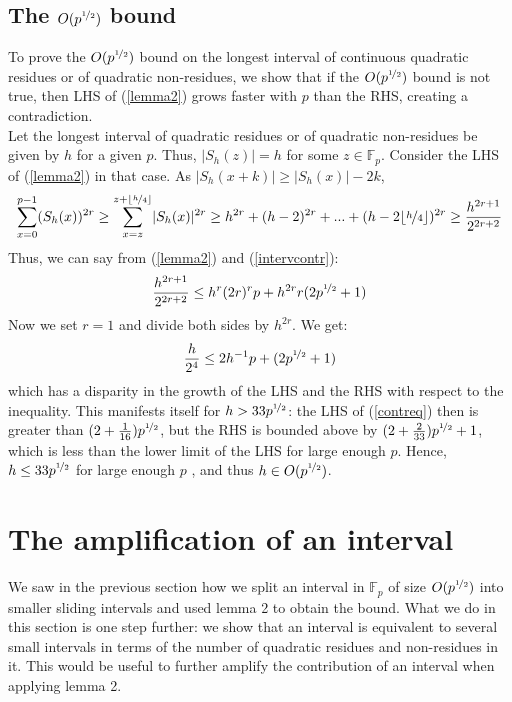 \documentclass{report}
\begin{document}
\subsection*{The $O(p^{\nicefrac{1}{2}})$ bound}
To prove the $O(p^{\nicefrac{1}{2}})$ bound on the longest interval of continuous quadratic residues or of quadratic non-residues, we show that if the $O(p^{\nicefrac{1}{2}})$ bound is not true, then LHS of (\ref{lemma2}) grows faster with $p$ than the RHS, creating a contradiction.\\
Let the longest interval of quadratic residues or of quadratic non-residues be given by $h$ for a given $p$. Thus, $\lvert S_h(z)\rvert=h$ for some $z\in \mathbb{F}_p$. Consider the LHS of (\ref{lemma2}) in that case. As $\lvert S_h(x+k)\rvert \geq \lvert S_h(x)\rvert-2k$,
\begin{equation} \label{intervcontr}
\sum\limits_{x=0}^{p-1}(S_h(x))^{2r}\geq\sum\limits_{x=z}^{z+\lfloor\nicefrac{h}{4}\rfloor}\lvert S_h(x)\rvert^{2r} \geq h^{2r}+(h-2)^{2r}+...+(h-2\lfloor\nicefrac{h}{4}\rfloor)^{2r} \geq \frac{h^{2r+1}}{2^{2r+2}}
\end{equation}
Thus, we can say from (\ref{lemma2}) and (\ref{intervcontr}):
$$ \frac{h^{2r+1}}{2^{2r+2}} \leq h^{r}(2r)^{r}p+h^{2r}r(2p^{\nicefrac{1}{2}}+1)$$
Now we set $r=1$ and divide both sides by $h^{2r}$. We get:
\begin{equation} \label{contreq}
\frac{h}{2^{4}} \leq 2h^{-1}p+(2p^{\nicefrac{1}{2}}+1)
\end{equation}
which has a disparity in the growth of the LHS and the RHS with respect to the inequality. This manifests itself for $h>33p^{\nicefrac{1}{2}}$: the LHS of (\ref{contreq}) then is greater than $(2+\frac{1}{16})p^{\nicefrac{1}{2}}$, but the RHS is bounded above by $(2+\frac{2}{33})p^{\nicefrac{1}{2}}+1$, which is less than the lower limit of the LHS for large enough $p$. Hence, $h\leq 33p^{\nicefrac{1}{2}}$ for large enough $p$ , and thus $h\in O(p^{\nicefrac{1}{2}})$.
%
%
\section{The amplification of an interval}
We saw in the previous section how we split an interval in $\mathbb{F}_p$ of size $O(p^{\nicefrac{1}{2}})$ into smaller sliding intervals and used lemma 2 to obtain the bound. What we do in this section is one step further: we show that an interval is equivalent to several small intervals in terms of the number of quadratic residues and non-residues in it. This would be useful to further amplify the contribution of an interval when applying lemma 2.
\end{document}
